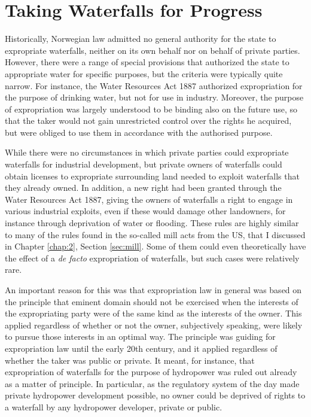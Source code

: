 \section{Taking Waterfalls for Progress}\label{sec:twp}

Historically, Norwegian law admitted no general authority for the state to expropriate waterfalls, neither on its own behalf nor on behalf of private parties. However, there were a range of special provisions that authorized the state to appropriate water for specific purposes, but the criteria were typically quite narrow. For instance, the Water Resources Act 1887 authorized expropriation for the purpose of drinking water, but not for use in industry. Moreover, the purpose of expropriation was largely understood to be binding also on the future use, so that the taker would not gain unrestricted control over the rights he acquired, but were obliged to use them in accordance with the authorised purpose.

While there were no circumstances in which private parties could expropriate waterfalls for industrial development, but private owners of waterfalls could obtain licenses to expropriate surrounding land needed to exploit waterfalls that they already owned. In addition, a new right had been granted through the Water Resources Act 1887, giving the owners of waterfalls a right to engage in various industrial exploits, even if these would damage other landowners, for instance through deprivation of water or flooding. These rules are highly similar to many of the rules found in the so-called mill acts from the US, that I discussed in Chapter \ref{chap:2}, Section \ref{sec:mill}. Some of them could even theoretically have the effect of a {\it de facto} expropriation of waterfalls, but such cases were relatively rare.

An important reason for this was that expropriation law in general was based on the principle that eminent domain should not be exercised when the interests of the expropriating party were of the same kind as the interests of the owner. This applied regardless of whether or not the owner, subjectively speaking, were likely to pursue those interests in an optimal way. The principle was guiding for expropriation law until the early 20th century, and it applied regardless of whether the taker was public or private. It meant, for instance, that expropriation of waterfalls for the purpose of hydropower was ruled out already as a matter of principle. In particular, as the regulatory system of the day made private hydropower development possible, no owner could be deprived of rights to 
a waterfall by any hydropower developer, private or public. 

